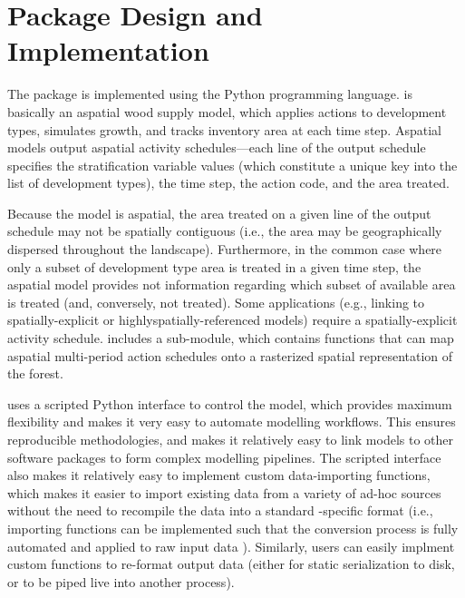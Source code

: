 \documentclass[letterpaper,10pt,english]{sphinxmanual}
\begin{document}
\section{Package Design and Implementation}
\label{\detokenize{intro:package-design-and-implementation}}
The  package is implemented using the Python programming language.  is basically an aspatial wood supply model, which applies actions to development types, simulates growth, and tracks inventory area at each time step. Aspatial models output aspatial activity schedules—each line of the output schedule specifies the stratification variable values (which constitute a unique key into the list of development types), the time step, the action code, and the area treated.

Because the model is aspatial, the area treated on a given line of the output schedule may not be spatially contiguous (i.e., the area may be geographically dispersed throughout the landscape). Furthermore, in the common case where only a subset of development type area is treated in a given time step, the aspatial model provides not information regarding which subset of available area is treated (and, conversely, not treated). Some applications (e.g., linking to spatially-explicit or highly\textendash{}spatially-referenced models) require a spatially-explicit activity schedule.  includes a  sub-module, which contains functions that can map aspatial multi-period action schedules onto a rasterized spatial representation of the forest.

 uses a scripted Python interface to control the model, which provides maximum flexibility and makes it very easy to automate modelling workflows. This ensures reproducible methodologies, and makes it relatively easy to link  models to other software packages to form complex modelling pipelines. The scripted interface also makes it relatively easy to implement custom data-importing functions, which makes it easier to import existing data from a variety of ad-hoc sources without the need to recompile the data into a standard -specific format (i.e., importing functions can be implemented such that the conversion process is fully automated and applied to raw input data ). Similarly, users can easily implment custom functions to re-format  output data  (either for static serialization to disk, or to be piped live into another process).
\end{document}
